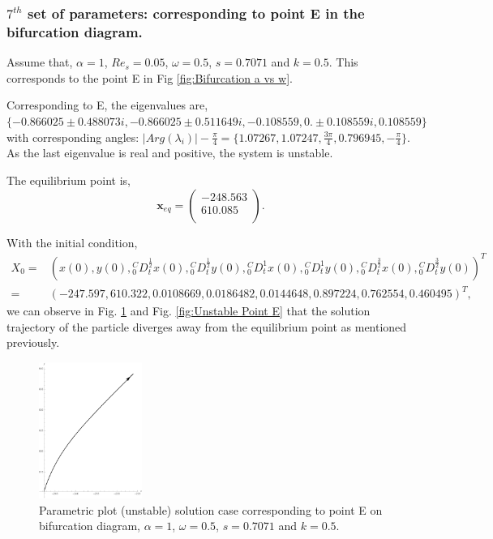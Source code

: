 \documentclass[pdflatex,sn-mathphys]{sn-jnl}%
\theoremstyle{thmstyleone}%
\theoremstyle{thmstyletwo}%
\theoremstyle{thmstylethree}%
\begin{document}
\subsubsection{$7^{th}$ set of parameters: corresponding to point E in the bifurcation diagram.}\label{$7{th}$ set}
Assume that, $\alpha = 1$, $Re_{s}=0.05$, $\omega=0.5$, $s=0.7071$ and $k=0.5$. This corresponds to the point E in Fig \ref{fig:Bifurcation a vs w}.

Corresponding to E, the eigenvalues are, $\{-0.866025 \pm 0.488073 i,-0.866025 \pm 0.511649 i,-0.108559,0.\pm 0.108559 i,0.108559\}$
with corresponding angles:  $\vert Arg(\lambda_{i})\vert - \frac{\pi}{4}= \{1.07267,1.07247,\frac{3 \pi}{4},0.796945, -\frac{\pi}{4}\}$. As the last eigenvalue is real and positive, the system is unstable.  

The equilibrium point is, $$\mathbf{x}_{eq}=\left(
\begin{array}{c}
 -248.563 \\
610.085\\
\end{array}
\right).$$ 

 With the initial condition, \begin{align*}
X_{0}=&
\left(
x(0) ,
y(0) ,
{ }_{0}^{C}D_{t}^{\frac{1}{2}}x(0) ,
{ }_{0}^{C}D_{t}^{\frac{1}{2}}y(0) ,
{ }_{0}^{C}D_{t}^{1} x(0) ,
{ }_{0}^{C}D_{t}^{1}y(0) ,
{ }_{0}^{C}D_{t}^{\frac{3}{2}}x(0) ,
{ }_{0}^{C}D_{t}^{\frac{3}{2}}y(0)
\right)^T \\ =& \left(
 -247.597,
 610.322,
 0.0108669,
 0.0186482,
 0.0144648,
 0.897224,
 0.762554,
 0.460495 
\right)^T,
\end{align*} we can observe in Fig. \ref{fig:Unstable parametric Point E} and Fig. \ref{fig:Unstable  Point E} that the solution trajectory of the particle diverges away from the equilibrium point as mentioned previously.  

  \begin{figure}
  \centering
    \includegraphics[width=0.3\textwidth]{Unstable_ais1Para}
    \caption{Parametric plot (unstable) solution  case corresponding to point E on bifurcation diagram, $\alpha = 1$, $\omega=0.5$, $s=0.7071$ and $k=0.5$.}
    \label{fig:Unstable parametric Point E}   
\end{figure} 
\end{document}
